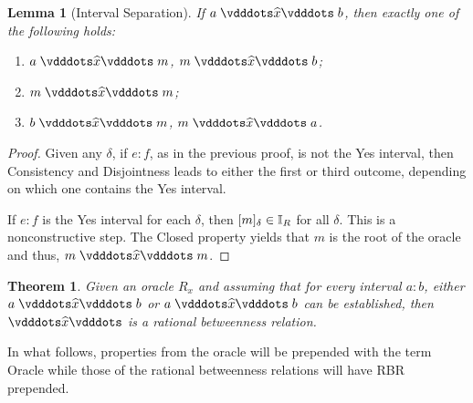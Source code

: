 \documentclass[12pt]{article}
\newtheorem{theorem}{Theorem}[section]
\newtheorem{lemma}{Lemma}[section]
\begin{document}
\begin{lemma}[Interval Separation]\label{os:intsep}
  If $a \xora b$, then exactly one of the following holds: 
  \begin{enumerate}
        \item $a\xora m$, \sout{$m \xora b$};
        \item $m \xora m$; 
        \item $b \xora m$, \sout{$m \xora a$}.
    \end{enumerate}
\end{lemma}

\begin{proof}
Given any $\delta$, if $e:f$, as in the previous proof, is not the Yes interval, then Consistency and Disjointness leads to either the first or third outcome, depending on which one contains the Yes interval. 

If $e:f$ is the Yes interval for each $\delta$, then $[m]_{\delta} \in \mathbb{I}_R$ for all $\delta$. This is a nonconstructive step. The Closed property yields that $m$ is the root of the oracle and thus, $m \xora m$.
\end{proof}


\begin{theorem}
    Given an oracle $R_x$ and assuming that for every interval $a:b$, either $a \xora b$ or \sout{$a \xora b$} can be established, then $\xora$ is a rational betweenness relation. 
\end{theorem}


In what follows, properties from the oracle will be prepended with the term Oracle while those of the rational betweenness relations will have RBR prepended. 
\end{document}
